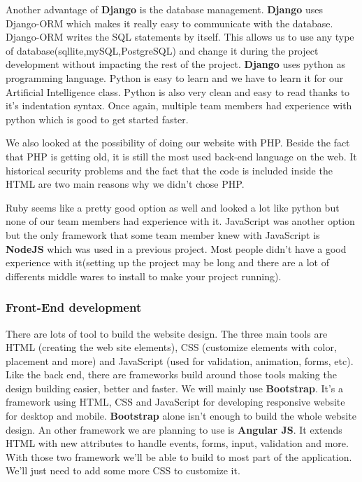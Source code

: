 Another advantage of \textbf{Django} is the database management. \textbf{Django} uses Django-ORM which makes it really easy to communicate with the database. Django-ORM writes the SQL statements by itself. This allows us to use any type of database(sqllite,mySQL,PostgreSQL) and change it during the project development without impacting the rest of the project.
\textbf{Django} uses python as programming language. Python is easy to learn and we have to learn it for our Artificial Intelligence class.
Python is also very clean and easy to read thanks to it's indentation syntax. Once again, multiple team members had experience with python which is good to get started faster.\newline

We also looked at the possibility of doing our website with PHP. Beside the fact that PHP is getting old, it is still the most used back-end language on the web. It historical security problems and the fact that the code is included inside the HTML are two main reasons why we didn't chose PHP.\newline

Ruby seems like a pretty good option as well and looked a lot like python but none of our team members had experience with it. JavaScript was another option but the only framework that some team member knew with JavaScript is \textbf{NodeJS} which was used in a previous project. Most people didn't have a good experience with it(setting up the project may be long and there are a lot of differents middle wares to install to make your project running).

\subsubsection{Front-End development}

There are lots of tool to build the website design. The three main tools are HTML (creating the web site elements), CSS (customize elements with color, placement and more) and JavaScript (used for validation, animation, forms, etc). Like the back end, there are frameworks build around those tools making the design building easier, better and faster. We will mainly use \textbf{Bootstrap}. It's a framework using HTML, CSS and JavaScript for developing responsive website for desktop and mobile. \textbf{Bootstrap} alone isn't enough to build the whole website design. An other framework we are planning to use is \textbf{Angular JS}. It extends HTML with new attributes to handle events, forms, input, validation and more. With those two framework we'll be able to build to most part of the application. We'll just need to add some more CSS to customize it.

